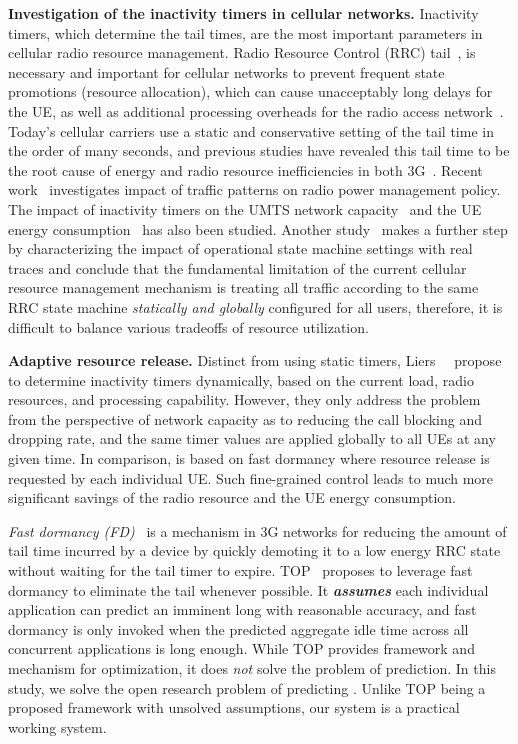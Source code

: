\textbf{Investigation of the inactivity timers in cellular networks.} Inactivity timers, which determine the tail times, are the most important parameters in cellular radio resource management. Radio Resource Control (RRC) tail~\cite{imc.tailender}, is necessary and important for cellular networks to prevent frequent state promotions (resource allocation), which can cause unacceptably long delays for the UE, as well as additional processing overheads for the radio access network~\cite{poor, infocom_lee}. Today's cellular carriers use a static and conservative setting of the tail time in the order of many seconds, and previous studies have revealed this tail time to be the root cause of energy and radio resource inefficiencies in both 3G~\cite{imc.3g, imc.tailender, wts04, Chuah:Impacts:WCNC2002}. Recent work~\cite{falaki10_imc} investigates impact of traffic patterns on radio power management policy. The impact of inactivity timers on the UMTS network capacity~\cite{Chuah:Impacts:WCNC2002} and the UE energy consumption~\cite{Lee:Impact:WTS2004, Yeh:Energy:ITVT2009} has also been studied. Another study~\cite{imc.3g} makes a further step by characterizing the impact of operational state machine settings with real traces and conclude that the fundamental limitation of the current cellular resource management mechanism is treating all traffic according to the same RRC state machine \emph{statically and globally} configured for all users, therefore, it is difficult to balance various tradeoffs of resource utilization.

\textbf{Adaptive resource release.}
Distinct from using static timers, Liers~\etal~\cite{Liers:DynamicTimeout:PIMRC2005} propose to determine inactivity timers dynamically, based on the current load, radio resources, and processing capability. However, they only address the problem from the perspective of network capacity as to reducing the call blocking and dropping rate, and the same timer values are applied globally to all UEs at any given time. In comparison, \NAME is based on fast dormancy where resource release is requested by each individual UE. Such fine-grained control leads to much more significant savings of the radio resource and the UE energy consumption.

{\em  Fast dormancy (FD)}~\cite{fast.dormancy.1, fast.dormancy.2} is a mechanism in 3G networks for reducing the amount of tail time incurred by a device by quickly demoting it to a low energy RRC state without waiting for the tail timer to expire. TOP~\cite{qian10_icnp} proposes to leverage fast dormancy to eliminate the tail whenever possible. It {\em \bf assumes} each individual application can predict an imminent long \IBT with reasonable accuracy, and fast dormancy is only invoked when the predicted aggregate idle time across all concurrent applications is long enough. While TOP provides framework and mechanism for optimization, it does {\em not} solve the problem of prediction. In this study, we solve the open research problem of predicting \IBTS. Unlike TOP being a proposed framework with unsolved assumptions, our system \NAME is a practical working system.

